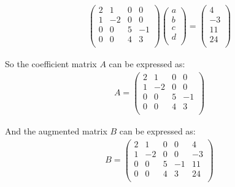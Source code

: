 \begin{equation}
\begin{aligned}
      \begin{pmatrix}
      2       & 1    & 0   & 0\\ 
      1       & -2   & 0   & 0\\
      0       & 0    & 5   & -1\\ 
      0       & 0   & 4   & 3\\
            
    \end{pmatrix} \begin{pmatrix}
      a\\ 
      b\\
      c\\
      d\\
            
    \end{pmatrix} = \begin{pmatrix}
      4\\ 
      -3\\
      11\\
      24\\
            
    \end{pmatrix} 
\end{aligned}
\end{equation}

So the coefficient matrix $A$ can be expressed as:\\

\begin{equation}
\begin{aligned}
    A=  \begin{pmatrix}
      2       & 1    & 0   & 0\\ 
      1       & -2   & 0   & 0\\
      0       & 0    & 5   & -1\\ 
      0       & 0   & 4   & 3\\
            
    \end{pmatrix} 
\end{aligned}
\end{equation}
 
And the augmented matrix $B$ can be expressed as:\\

\begin{equation}
\begin{aligned}
    B=  \begin{pmatrix}
      2       & 1    & 0   & 0  & 4\\ 
      1       & -2   & 0   & 0  & -3\\
      0       & 0    & 5   & -1  & 11\\ 
      0       & 0   & 4   & 3   & 24\\
            
    \end{pmatrix}
\end{aligned}
\end{equation}

